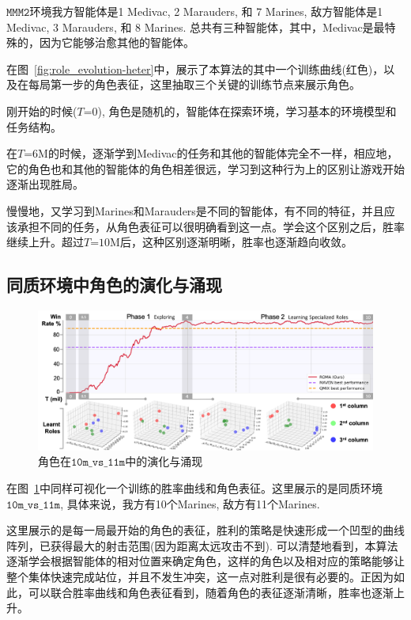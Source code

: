 $\mathtt{MMM2}$环境我方智能体是1 Medivac, 2 Marauders, 和 7 Marines, 敌方智能体是1 Medivac, 3 Marauders, 和 8 Marines. 总共有三种智能体，其中，Medivac是最特殊的，因为它能够治愈其他的智能体。

在图~\ref{fig:role_evolution-heter}中，展示了本算法的其中一个训练曲线(红色)，以及在每局第一步的角色表征，这里抽取三个关键的训练节点来展示角色。

刚开始的时候($T$=$0$), 角色是随机的，智能体在探索环境，学习基本的环境模型和任务结构。

在$T$=$6$M的时候，逐渐学到Medivac的任务和其他的智能体完全不一样，相应地，它的角色也和其他的智能体的角色相差很远，学习到这种行为上的区别让游戏开始逐渐出现胜局。

慢慢地，又学习到Marines和Marauders是不同的智能体，有不同的特征，并且应该承担不同的任务，从角色表征可以很明确看到这一点。学会这个区别之后，胜率继续上升。超过$T$=$10$M后，这种区别逐渐明晰，胜率也逐渐趋向收敛。

\subsection{同质环境中角色的演化与涌现}
\begin{figure}
  \includegraphics[width=\linewidth]{figures/evolution/evolution_10m_vs_11m.png}
  \caption{角色在$\mathtt{10m\_vs\_11m}$中的演化与涌现}\label{fig:role_evolution-homo}
\end{figure}

在图~\ref{fig:role_evolution-homo}中同样可视化一个训练的胜率曲线和角色表征。这里展示的是同质环境$\mathtt{10m\_vs\_11m}$, 具体来说，我方有10个Marines, 敌方有11个Marines.

这里展示的是每一局最开始的角色的表征，胜利的策略是快速形成一个凹型的曲线阵列，已获得最大的射击范围(因为距离太远攻击不到). 可以清楚地看到，本算法逐渐学会根据智能体的相对位置来确定角色，这样的角色以及相对应的策略能够让整个集体快速完成站位，并且不发生冲突，这一点对胜利是很有必要的。正因为如此，可以联合胜率曲线和角色表征看到，随着角色的表征逐渐清晰，胜率也逐渐上升。

